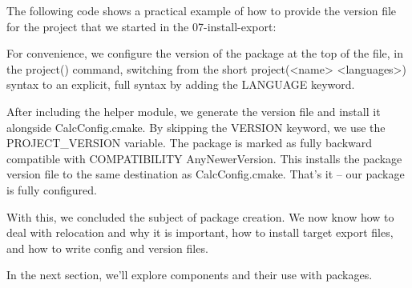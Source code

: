 The following code shows a practical example of how to provide the version file for the project that we started in the 07-install-export:



For convenience, we configure the version of the package at the top of the file, in the project() command, switching from the short project(<name> <languages>) syntax to an explicit, full syntax by adding the LANGUAGE keyword.

After including the helper module, we generate the version file and install it alongside CalcConfig.cmake. By skipping the VERSION keyword, we use the PROJECT\_VERSION variable. The package is marked as fully backward compatible with COMPATIBILITY AnyNewerVersion. This installs the package version file to the same destination as CalcConfig.cmake. That’s it – our package is fully configured.

With this, we concluded the subject of package creation. We now know how to deal with relocation and why it is important, how to install target export files, and how to write config and version files.

In the next section, we’ll explore components and their use with packages.





























